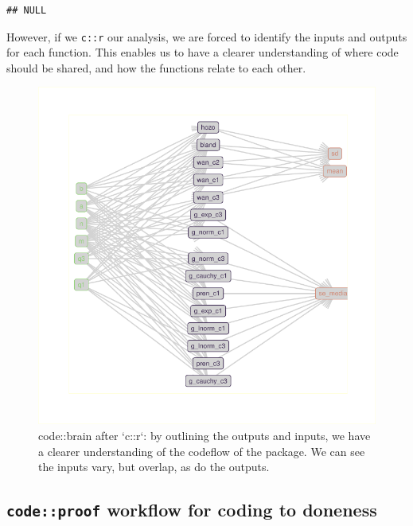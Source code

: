 \documentclass[
]{article}
\begin{document}
\begin{verbatim}
## NULL
\end{verbatim}

However, if we \texttt{c::r} our analysis, we are forced to identify the inputs and outputs for each function. This enables us to have a clearer understanding of where code should be shared, and how the functions relate to each other.

\begin{figure}

{\centering \includegraphics{when-is-done-done_files/figure-latex/codebraingood-1} 

}

\caption{code::brain after `c::r`: by outlining the outputs and inputs, we have a clearer understanding of the codeflow of the package. We can see the inputs vary, but overlap, as do the outputs.}\label{fig:codebraingood}
\end{figure}

\hypertarget{codeproof-workflow-for-coding-to-doneness}{%
\subsection{\texorpdfstring{\texttt{code::proof} workflow for coding to doneness}{code::proof workflow for coding to doneness}}\label{codeproof-workflow-for-coding-to-doneness}}
\end{document}
